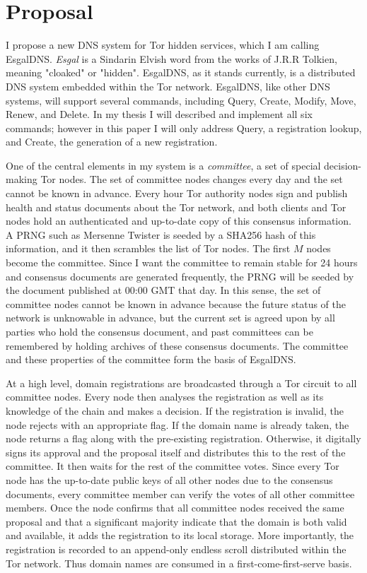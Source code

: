 \documentclass[journal]{IEEEtran}
\begin{document}
\section{Proposal}

I propose a new DNS system for Tor hidden services, which I am calling EsgalDNS. \textit{Esgal} is a Sindarin Elvish word from the works of J.R.R Tolkien, meaning "cloaked" or "hidden". EsgalDNS, as it stands currently, is a distributed DNS system embedded within the Tor network. EsgalDNS, like other DNS systems, will support several commands, including Query, Create, Modify, Move, Renew, and Delete. In my thesis I will described and implement all six commands; however in this paper I will only address Query, a registration lookup, and Create, the generation of a new registration.

One of the central elements in my system is a \textit{committee}, a set of special decision-making Tor nodes. The set of committee nodes changes every day and the set cannot be known in advance. Every hour Tor authority nodes sign and publish health and status documents about the Tor network, and both clients and Tor nodes hold an authenticated and up-to-date copy of this consensus information. A PRNG such as Mersenne Twister is seeded by a SHA256 hash of this information, and it then scrambles the list of Tor nodes. The first $ M $ nodes become the committee. Since I want the committee to remain stable for 24 hours and consensus documents are generated frequently, the PRNG will be seeded by the document published at 00:00 GMT that day. In this sense, the set of committee nodes cannot be known in advance because the future status of the network is unknowable in advance, but the current set is agreed upon by all parties who hold the consensus document, and past committees can be remembered by holding archives of these consensus documents. The committee and these properties of the committee form the basis of EsgalDNS.

At a high level, domain registrations are broadcasted through a Tor circuit to all committee nodes. Every node then analyses the registration as well as its knowledge of the chain and makes a decision. If the registration is invalid, the node rejects with an appropriate flag. If the domain name is already taken, the node returns a flag along with the pre-existing registration. Otherwise, it digitally signs its approval and the proposal itself and distributes this to the rest of the committee. It then waits for the rest of the committee votes. Since every Tor node has the up-to-date public keys of all other nodes due to the consensus documents, every committee member can verify the votes of all other committee members. Once the node confirms that all committee nodes received the same proposal and that a significant majority indicate that the domain is both valid and available, it adds the registration to its local storage. More importantly, the registration is recorded to an append-only endless scroll distributed within the Tor network. Thus domain names are consumed in a first-come-first-serve basis.
\end{document}
